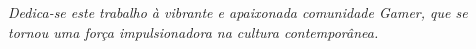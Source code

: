 \begin{dedicatoria}
   \vspace*{\fill}
   \centering
   \noindent
   \textit{Dedica-se este trabalho à vibrante e apaixonada comunidade Gamer, que se tornou uma força impulsionadora na cultura contemporânea.} 
   \vspace*{\fill}
   
\end{dedicatoria}

\pagebreak